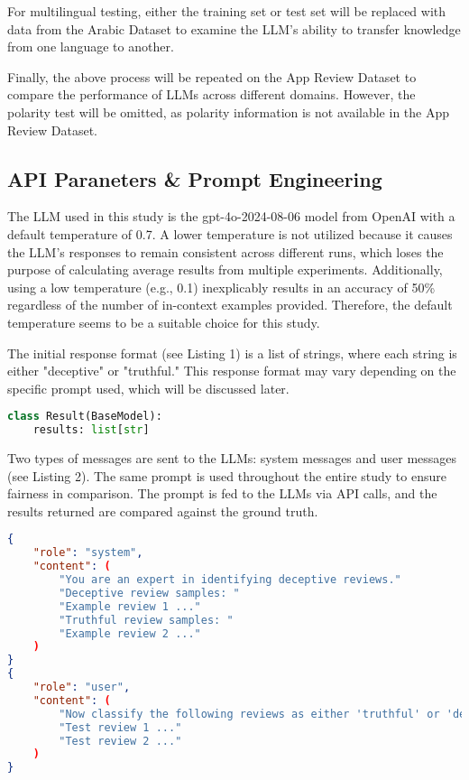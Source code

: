 \documentclass[sigconf, nonacm]{acmart}
\theoremstyle{definition}
\begin{document}
For multilingual testing, either the training set or test set will be replaced with data from the Arabic Dataset to examine the LLM's ability to transfer knowledge from one language to another.

Finally, the above process will be repeated on the App Review Dataset to compare the performance of LLMs across different domains. However, the polarity test will be omitted, as polarity information is not available in the App Review Dataset.

\subsection{API Paraneters \& Prompt Engineering}

The LLM used in this study is the gpt-4o-2024-08-06 model from OpenAI with a default temperature of 0.7. A lower temperature is not utilized because it causes the LLM's responses to remain consistent across different runs, which loses the purpose of calculating average results from multiple experiments. Additionally, using a low temperature (e.g., 0.1) inexplicably results in an accuracy of 50\% regardless of the number of in-context examples provided. Therefore, the default temperature seems to be a suitable choice for this study.

The initial response format (see Listing 1) is a list of strings, where each string is either "deceptive" or "truthful." This response format may vary depending on the specific prompt used, which will be discussed later.

\begin{lstlisting}[language=Python, caption={Initial Response Format}]
class Result(BaseModel):
    results: list[str]
\end{lstlisting}

Two types of messages are sent to the LLMs: system messages and user messages (see Listing 2). The same prompt is used throughout the entire study to ensure fairness in comparison. The prompt is fed to the LLMs via API calls, and the results returned are compared against the ground truth.

\begin{lstlisting}[language=json, caption={Initial Prompt Messages}]
{
    "role": "system",
    "content": (
        "You are an expert in identifying deceptive reviews."
        "Deceptive review samples: "
        "Example review 1 ..."
        "Truthful review samples: "
        "Example review 2 ..."
    )
}
{
    "role": "user",
    "content": (
        "Now classify the following reviews as either 'truthful' or 'deceptive': "
        "Test review 1 ..."
        "Test review 2 ..."
    )
}
\end{lstlisting}
\end{document}
